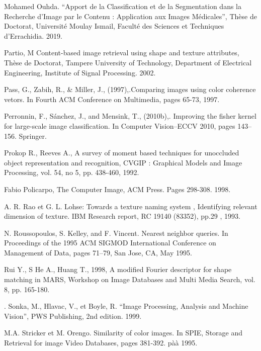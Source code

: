 \documentclass[
openany,
11pt, %
french, %
singlespacing, %
headsepline, %
]{MastersDoctoralThesis} %
\begin{document}
\begin{thebibliography}{widest entry}
	
	  Mohamed Ouhda. “Apport de la Classification et de la Segmentation dans la Recherche d’Image par le Contenu : Application aux
	Images Médicales”, Thèse de Doctorat, Université Moulay Ismail, Faculté des Sciences et Techniques d’Errachidia. 2019.
	
	 Partio, M Content-based image retrieval using shape and texture attributes, Thèse de Doctorat, Tampere University of Technology, Department of Electrical Engineering, Institute of Signal Processing. 2002.
	
	  Pass, G., Zabih, R., \& Miller, J., (1997),.Comparing images using color coherence vetors. In Fourth ACM Conference on Multimedia, pages 65-73, 1997.
	
	  Perronnin, F., Sánchez, J., and Mensink, T., (2010b),. Improving the fisher kernel for large-scale image classification. In Computer Vision–ECCV 2010, pages 143–156. Springer.
	
	  Prokop R., Reeves A., A survey of moment based techniques for unoccluded object representation and recognition, CVGIP : Graphical Models and Image Processing, vol. 54, no 5, pp. 438-460, 1992.
	
	 Fabio Policarpo, The Computer Image, ACM Press. Pages 298-308. 1998.
	
	  A. R. Rao et G. L. Lohse: Towards a texture naming system , Identifying relevant dimension of texture. IBM Research report, RC 19140 (83352), pp.29 , 1993.
	
	 N. Roussopoulos, S. Kelley, and F. Vincent. Nearest neighbor queries. In Proceedings of the 1995 ACM SIGMOD International Conference on Management of Data, pages 71–79, San Jose, CA, May 1995. 
	
	 Rui Y., S He A., Huang T., 1998, A modified Fourier descriptor for shape matching in
	MARS, Workshop on Image Databases and Multi Media Search, vol. 8, pp. 165-180.
	
	
	 . Sonka, M., Hlavac, V., et Boyle, R. “Image Processing, Analysis and Machine Vision”, PWS Publishing, 2nd edition. 1999.
	
	  M.A. Stricker et M. Orengo. Similarity of color images. In SPIE, Storage
	and Retrieval for image Video Databases, pages 381-392. pàà 1995.
	

\end{thebibliography}
\end{document}
